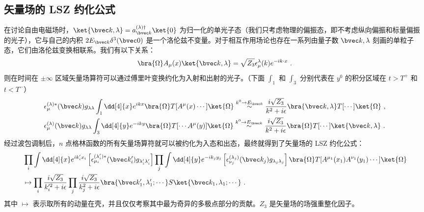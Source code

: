 \subsection{矢量场的 LSZ 约化公式}
在讨论自由电磁场时，$\ket{\bvec k,\lambda}=a_{\bvec k}^{(\lambda)\dagger}\ket{0}$ 为归一化的单光子态（我们只考虑物理的偏振态，即不考虑纵向偏振和标量偏振的光子），它与自己的内积 $2E_{\bvec k}\delta^3(\bvec 0)$ 是一个洛伦兹不变量。对于相互作用场论也存在一系列由量子数 $\bvec k,\lambda$ 刻画的单粒子态，它们由洛伦兹变换相联系。我们有以下关系：
\[
\bra{\Omega}A_\mu(x)\ket{\bvec k,\lambda}=\sqrt{Z_3}\epsilon_\mu^{\lambda}(k)e^{-ik\cdot x}~.
\]
则在时间在 $\pm \infty$ 区域矢量场算符可以通过傅里叶变换约化为入射和出射的光子。（下面 $\int_1$ 和 $\int_3$ 分别代表在 $y^0$ 的积分区域在 $t>T^+$ 和 $t<T^-$）
\begin{equation}
\begin{aligned}
&\epsilon_\mu^{(\lambda)*}(\bvec k)g_{\lambda\lambda}\int_{ 1} \dd[4]{x} e^{ikx} \bra{\Omega}T[A^\mu(x)\cdots]\ket{\Omega}
\stackrel{k^0\rightarrow E_{\bvec k}}{\sim}
\frac{i\sqrt{Z_3}}{k^2+i\epsilon} \bra{\bvec k,\lambda} T[\cdots]\ket{\Omega}
~,\\
&
\epsilon_\mu^{(\lambda)}(\bvec k)g_{\lambda\lambda}
\int_{3} \dd[4]{y} e^{-iky}
\bra{\Omega}T[\cdots A^\mu(y)]\ket{ \Omega}
\stackrel{k^0\rightarrow E_{\bvec k}}{\sim}
\frac{i\sqrt{Z_3}}{k^2+i\epsilon}\bra{\Omega} T[\cdots]\ket{\bvec k,\lambda}~.
\end{aligned}
\end{equation}
经过波包调制后，$n$ 点格林函数的所有矢量场算符就可以被约化为入态和出态，最终就得到了矢量场的 LSZ 约化公式：
\begin{equation}
\begin{aligned}
&\prod_{i}\int \dd[4]{x} e^{ik'_ix_i} 
\left[\epsilon_{\mu_i}^{(\lambda'_i)*}(\bvec k'_i)g_{\lambda'_i\lambda'_i}\right] 
\prod_{j}\int \dd[4]{y} e^{-ik_jy_j}  \left[\epsilon_{\nu_j}^{(\lambda_j)}(\bvec k_j) g_{\lambda_j\lambda_j}\right]
\bra{\Omega}T[A^{\mu_1}(x_1)A^{\nu_1}(y_1)\cdots]\ket{\Omega}
\\
&\mapsto \prod_i\frac{i\sqrt{Z_3}}{k_i'^2+i\epsilon}\prod_j \frac{i\sqrt{Z_3}}{k_j^2+i\epsilon}\bra{\bvec k'_1,\lambda'_1;\cdots}S\ket{\bvec k_1,\lambda_1;\cdots}~.
\end{aligned}
\end{equation}
其中 $\mapsto$ 表示取所有的动量在壳，并且仅仅考察其中最为奇异的多极点部分的贡献。$Z_3$ 是矢量场的场强重整化因子。

